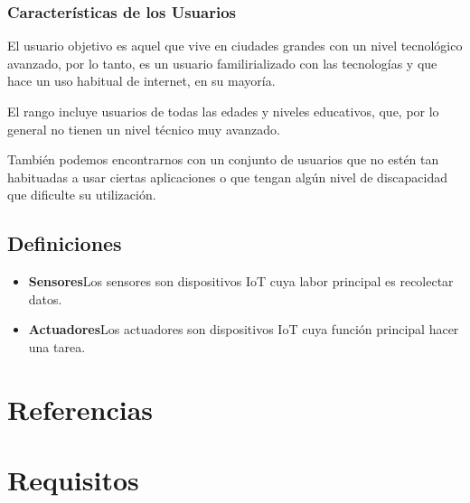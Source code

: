 \documentclass[12pt, a4paper, twoside]{article}
\newcommand\ttab{\tab \hspace{-5cm}}
\begin{document}
 \subsubsection{Características de los Usuarios}
 El usuario objetivo es aquel que vive en ciudades grandes con un nivel tecnológico avanzado,
 por lo tanto, es un usuario familirializado con las tecnologías y que hace un uso
 habitual de internet, en su mayoría.

 El rango incluye usuarios de todas las edades y niveles educativos, que, por lo general
 no tienen un nivel técnico muy avanzado.

 También podemos encontrarnos con un conjunto de usuarios que
 no estén tan habituadas a usar ciertas aplicaciones o que tengan algún nivel de discapacidad
 que dificulte su utilización.


\subsection{Definiciones}
\begin{itemize}
    \item \textbf{Sensores}\ttab Los sensores son dispositivos IoT cuya labor principal es recolectar datos.
    \item \textbf{Actuadores}\ttab Los actuadores son dispositivos IoT cuya función principal hacer una tarea.
\end{itemize}

\section{Referencias}

\section{Requisitos}
\end{document}
